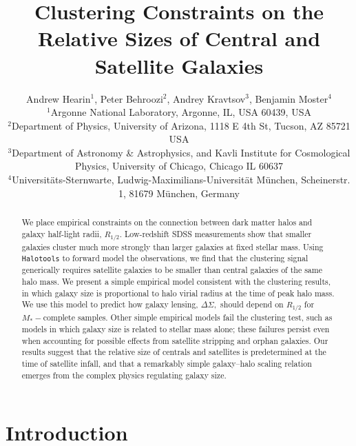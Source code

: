 \documentclass[usenatbib,usegraphicx,letterpaper]{mn2e}
\newcommand{\rhalf}{R_{1/2}}
\newcommand{\mstar}{M_{\ast}}
\begin{document}
\title[The Relative Sizes of Centrals and Satellites]
{Clustering Constraints on the Relative Sizes of Central and Satellite Galaxies}


\author[Hearin, Behroozi, Kravtsov \& Moster]{
Andrew Hearin$^{1}$, Peter Behroozi$^{2}$, Andrey Kravtsov$^{3}$, Benjamin Moster$^{4}$\\
$^{1}$Argonne National Laboratory, Argonne, IL, USA 60439, USA\\
$^{2}$Department of Physics, University of Arizona, 1118 E 4th St, Tucson, AZ 85721 USA\\
$^{3}$Department of Astronomy \& Astrophysics, and Kavli Institute for Cosmological Physics, University of Chicago, Chicago IL 60637\\
$^{4}$Universit{\"a}ts-Sternwarte, Ludwig-Maximilians-Universit{\"a}t M{\"u}nchen, Scheinerstr. 1, 81679 M{\"u}nchen, Germany
}

\maketitle

\begin{abstract}
We place empirical constraints on the connection between dark matter halos and galaxy half-light radii, $\rhalf.$ Low-redshift SDSS measurements show that smaller galaxies cluster much more strongly than larger galaxies at fixed stellar mass. Using {\tt Halotools} to forward model the observations, we find that the clustering signal generically requires satellite galaxies to be smaller than central galaxies of the same halo mass. We present a simple empirical model consistent with the clustering results, in which galaxy size is proportional to halo virial radius at the time of peak halo mass. We use this model to predict how galaxy lensing, $\Delta\Sigma,$ should depend on $\rhalf$ for $\mstar-$complete samples. Other simple empirical models fail the clustering test, such as models in which galaxy size is related to stellar mass alone; these failures persist even when accounting for possible effects from satellite stripping and orphan galaxies. Our results suggest that the relative size of centrals and satellites is predetermined at the time of satellite infall, and that a remarkably simple galaxy--halo scaling relation emerges from the complex physics regulating galaxy size.
\end{abstract}

\section{Introduction}
\label{sec:intro}
\end{document}
